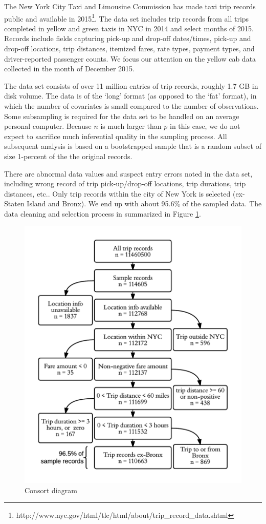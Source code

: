 \documentclass[10pt,a4paper]{article} %
\begin{document}
    {The New York City Taxi and Limousine Commission has made taxi trip records public and available in 2015\footnote{http://www.nyc.gov/html/tlc/html/about/trip\_record\_data.shtml}. The data set includes trip records from all trips completed in yellow and green taxis in NYC in 2014 and select months of 2015. Records include fields capturing pick-up and drop-off dates/times, pick-up and drop-off locations, trip distances, itemized fares, rate types, payment types, and driver-reported passenger counts. 
    We focus our attention on the yellow cab data collected in the month of December 2015.
    
    The data set consists of over 11 million entries of trip records, roughly 1.7 GB in disk volume. The data is of the `long' format (as opposed to the `fat' format), in which the number of covariates is small compared to the number of observations. Some subsampling is required for the data set to be handled on an average personal computer. Because $n$ is much larger than $p$ in this case, we do not expect to sacrifice much inferential quality in the sampling process. All subsequent analysis is based on a bootstrapped sample that is a random subset of size 1-percent of the the original records.
    
    There are abnormal data values and suspect entry errors noted in the data set, including wrong record of trip pick-up/drop-off locations, trip durations, trip distances, etc..  Only trip records within the city of New York is selected (ex-Staten Island and Bronx). We end up with about 95.6\% of the sampled data. The data cleaning and selection process in summarized in Figure \ref{fig:consort}.
    
    \begin{figure}
    \centering
    \includegraphics[width=0.5\linewidth]{consort_diagram.png}
    \caption{Consort diagram}\label{fig:consort}
    \end{figure} 
    
}
\end{document}
